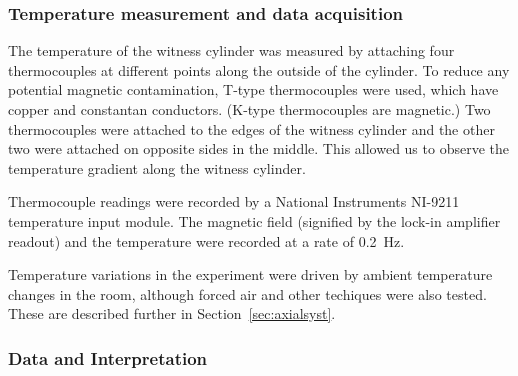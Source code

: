 \subsubsection{Temperature measurement and data acquisition}


%


The temperature of the witness cylinder was measured by attaching four
thermocouples at different points along the outside of the cylinder.
To reduce any potential magnetic contamination, T-type thermocouples
were used, which have copper and constantan conductors.  (K-type
thermocouples are magnetic.)  Two thermocouples were attached to the
edges of the witness cylinder and the other two were attached on
opposite sides in the middle.  This allowed us to observe the
temperature gradient along the witness cylinder.

Thermocouple readings were recorded by a National Instruments NI-9211
temperature input module.  The magnetic field (signified by the
lock-in amplifier readout) and the temperature were recorded at a rate
of 0.2~Hz.

Temperature variations in the experiment were driven by ambient
temperature changes in the room, although forced air and other
techiques were also tested.  These are described further in
Section~\ref{sec:axialsyst}.


\subsubsection{Data and Interpretation}

